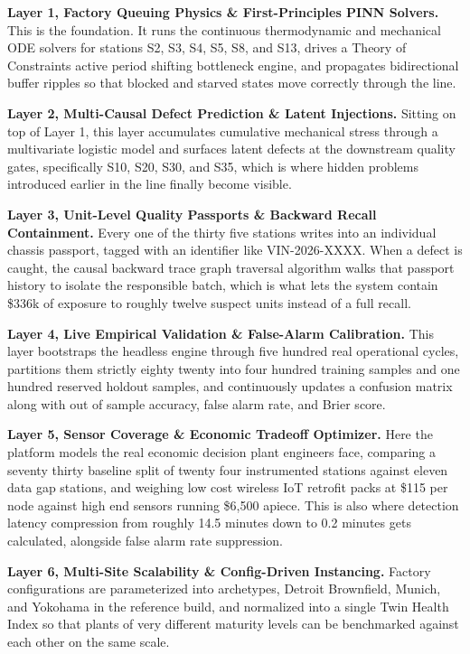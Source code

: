 \documentclass[11pt]{article}
\begin{document}
\textbf{Layer 1, Factory Queuing Physics \& First-Principles PINN Solvers.} This is the foundation. It runs the continuous thermodynamic and mechanical ODE solvers for stations S2, S3, S4, S5, S8, and S13, drives a Theory of Constraints active period shifting bottleneck engine, and propagates bidirectional buffer ripples so that blocked and starved states move correctly through the line.

\textbf{Layer 2, Multi-Causal Defect Prediction \& Latent Injections.} Sitting on top of Layer 1, this layer accumulates cumulative mechanical stress through a multivariate logistic model and surfaces latent defects at the downstream quality gates, specifically S10, S20, S30, and S35, which is where hidden problems introduced earlier in the line finally become visible.

\textbf{Layer 3, Unit-Level Quality Passports \& Backward Recall Containment.} Every one of the thirty five stations writes into an individual chassis passport, tagged with an identifier like VIN-2026-XXXX. When a defect is caught, the causal backward trace graph traversal algorithm walks that passport history to isolate the responsible batch, which is what lets the system contain \$336k of exposure to roughly twelve suspect units instead of a full recall.

\textbf{Layer 4, Live Empirical Validation \& False-Alarm Calibration.} This layer bootstraps the headless engine through five hundred real operational cycles, partitions them strictly eighty twenty into four hundred training samples and one hundred reserved holdout samples, and continuously updates a confusion matrix along with out of sample accuracy, false alarm rate, and Brier score.

\textbf{Layer 5, Sensor Coverage \& Economic Tradeoff Optimizer.} Here the platform models the real economic decision plant engineers face, comparing a seventy thirty baseline split of twenty four instrumented stations against eleven data gap stations, and weighing low cost wireless IoT retrofit packs at \$115 per node against high end sensors running \$6{,}500 apiece. This is also where detection latency compression from roughly 14.5 minutes down to 0.2 minutes gets calculated, alongside false alarm rate suppression.

\textbf{Layer 6, Multi-Site Scalability \& Config-Driven Instancing.} Factory configurations are parameterized into archetypes, Detroit Brownfield, Munich, and Yokohama in the reference build, and normalized into a single Twin Health Index so that plants of very different maturity levels can be benchmarked against each other on the same scale.
\end{document}
